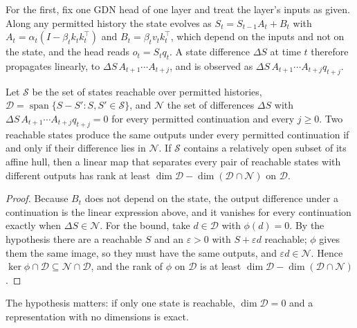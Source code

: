 For the first, fix one GDN head of one layer and treat the layer's inputs as given. Along any permitted history the state evolves as $S_t=S_{t-1}A_t+B_t$ with $A_t=\alpha_t(I-\beta_tk_tk_t^\top)$ and $B_t=\beta_tv_tk_t^\top$, which depend on the inputs and not on the state, and the head reads $o_t=S_tq_t$. A state difference $\Delta S$ at time $t$ therefore propagates linearly, to $\Delta S\,A_{t+1}\cdots A_{t+j}$, and is observed as $\Delta S\,A_{t+1}\cdots A_{t+j}q_{t+j}$.

\begin{proposition}\label{prop:minimal-state}
Let $\mathcal S$ be the set of states reachable over permitted histories, $\mathcal D=\operatorname{span}\{S-S':S,S'\in\mathcal S\}$, and $\mathcal N$ the set of differences $\Delta S$ with $\Delta S\,A_{t+1}\cdots A_{t+j}q_{t+j}=0$ for every permitted continuation and every $j\ge0$. Two reachable states produce the same outputs under every permitted continuation if and only if their difference lies in $\mathcal N$. If $\mathcal S$ contains a relatively open subset of its affine hull, then a linear map that separates every pair of reachable states with different outputs has rank at least $\dim\mathcal D-\dim(\mathcal D\cap\mathcal N)$ on $\mathcal D$.
\end{proposition}
\begin{proof}
Because $B_t$ does not depend on the state, the output difference under a continuation is the linear expression above, and it vanishes for every continuation exactly when $\Delta S\in\mathcal N$. For the bound, take $d\in\mathcal D$ with $\phi(d)=0$. By the hypothesis there are a reachable $S$ and an $\varepsilon>0$ with $S+\varepsilon d$ reachable; $\phi$ gives them the same image, so they must have the same outputs, and $\varepsilon d\in\mathcal N$. Hence $\ker\phi\cap\mathcal D\subseteq\mathcal N\cap\mathcal D$, and the rank of $\phi$ on $\mathcal D$ is at least $\dim\mathcal D-\dim(\mathcal D\cap\mathcal N)$.
\end{proof}
The hypothesis matters: if only one state is reachable, $\dim\mathcal D=0$ and a representation with no dimensions is exact.
